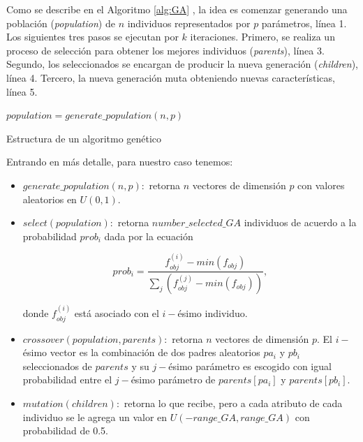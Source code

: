 
Como se describe en el Algoritmo \ref{alg:GA} \citep{Mykel2019}, la idea es  
comenzar generando una población (\emph{population}) de $n$ individuos representados por $p$
parámetros, línea 1. 
Los siguientes tres pasos se ejecutan por $k$ iteraciones.
Primero, se realiza un proceso de selección para obtener los mejores individuos
(\emph{parents}), línea 3.
Segundo, los seleccionados se encargan de producir la nueva generación
(\emph{children}), línea 4.
Tercero, la nueva generación muta obteniendo nuevas características, línea 5.

\begin{algorithm}
$population = generate\_population(n, p)$ \\
\caption{Estructura de un algoritmo genético}
\label{alg:GA}
\end{algorithm}

Entrando en más detalle, para nuestro caso tenemos:

\begin{itemize}
    \item $generate\_population(n, p):$ retorna $n$ vectores de dimensión $p$
      con valores aleatorios en $U(0, 1)$.

    \item $select(population):$ retorna $number\_selected\_GA$ individuos de
      acuerdo a la probabilidad $prob_i$ dada por la ecuación
    
    \begin{equation}
      prob_i = \frac{f_{obj}^{(i)} - min(f_{obj})}{\displaystyle\sum_{j} (f_{obj}^{(j)} - min(f_{obj}))},
    \label{eq:prob}
    \end{equation}
    
    donde $f_{obj}^{(i)}$ está asociado con el $i-$ésimo individuo.
    
    \item $crossover(population, parents):$ retorna $n$ vectores de dimensión $p$.
    El $i-$ésimo vector es la combinación de dos padres aleatorios $pa_i$
    y $pb_i$ seleccionados de $parents$ y su $j-$ésimo parámetro es escogido
    con igual probabilidad entre el $j-$ésimo parámetro de $parents[pa_i]$
    y $parents[pb_i]$.

    \item $mutation(children):$ retorna lo que recibe, pero a cada atributo de
      cada individuo se le agrega un valor en $U(-range\_GA, range\_GA)$ con
      probabilidad de 0.5.

\end{itemize}

